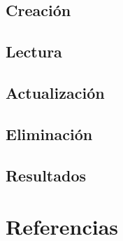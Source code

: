 \documentclass[12pt]{article}
\begin{document}
\subsection{Creación}

\subsubsection*{}

\subsection{Lectura}

\subsection{Actualización}

\subsection{Eliminación}

\subsection{Resultados}

\section{Referencias}
\end{document}
